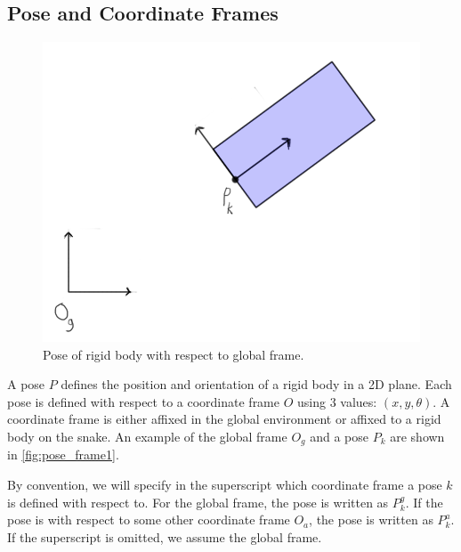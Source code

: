 \subsection{Pose and Coordinate Frames}
\label{poseandcoordinateframes}

\begin{figure}[htbp]
\centering
\includegraphics[keepaspectratio,width=400pt,height=0.75\textheight]{3_pose_frame1.png}
\caption{Pose of rigid body with respect to global frame.}
\label{fig:pose_frame1}
\end{figure}


A pose $P$ defines the position and orientation of a rigid body in a 2D plane. Each pose is defined with respect to a coordinate frame $O$ using 3 values: $(x,y,\theta)$. A coordinate frame is either affixed in the global environment or affixed to a rigid body on the snake. An example of the global frame $O_g$ and a pose $P_k$ are shown in \autoref{fig:pose_frame1}.

By convention, we will specify in the superscript which coordinate frame a pose $k$ is defined with respect to. For the global frame, the pose is written as $P_k^g$. If the pose is with respect to some other coordinate frame $O_a$, the pose is written as $P_k^a$. If the superscript is omitted, we assume the global frame.

